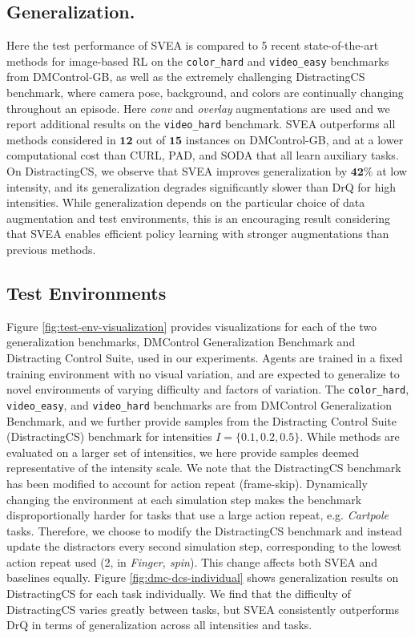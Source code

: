 \subsection{\textbf{Generalization.}}
Here the test performance of SVEA is compared to 5 recent state-of-the-art methods for image-based RL on the \texttt{color\_hard} and \texttt{video\_easy} benchmarks from DMControl-GB, as well as the extremely challenging DistractingCS benchmark, where camera pose, background, and colors are continually changing throughout an episode. Here \textit{conv} and \textit{overlay} augmentations are used and we report additional results on the \texttt{video\_hard} benchmark. SVEA outperforms all methods considered in $\mathbf{12}$ out of $\mathbf{15}$ instances on DMControl-GB, and at a lower computational cost than CURL, PAD, and SODA that all learn auxiliary tasks. On DistractingCS, we observe that SVEA improves generalization by $\mathbf{42\%}$ at low intensity, and its generalization degrades significantly slower than DrQ for high intensities. While generalization depends on the particular choice of data augmentation and test environments, this is an encouraging result considering that SVEA enables efficient policy learning with stronger augmentations than previous methods.


\subsection{\textbf{Test Environments}}
Figure \ref{fig:test-env-visualization} provides visualizations for each of the two generalization benchmarks, DMControl Generalization Benchmark and Distracting Control Suite, used in our experiments. Agents are trained in a fixed training environment with no visual variation, and are expected to generalize to novel environments of varying difficulty and factors of variation. The \texttt{color\_hard}, \texttt{video\_easy}, and \texttt{video\_hard} benchmarks are from DMControl Generalization Benchmark, and we further provide samples from the Distracting Control Suite (DistractingCS) benchmark for intensities $I=\{0.1, 0.2, 0.5\}$. 
While methods are evaluated on a larger set of intensities, we here provide samples deemed representative of the intensity scale. We note that the DistractingCS benchmark has been modified to account for action repeat (frame-skip). Dynamically changing the environment at each simulation step makes the benchmark disproportionally harder for tasks that use a large action repeat, e.g. \textit{Cartpole} tasks. Therefore, we choose to modify the DistractingCS benchmark and instead update the distractors every second simulation step, corresponding to the lowest action repeat used (2, in \textit{Finger, spin}). This change affects both SVEA and baselines equally. Figure \ref{fig:dmc-dcs-individual} shows generalization results on DistractingCS for each task individually. We find that the difficulty of DistractingCS varies greatly between tasks, but SVEA consistently outperforms DrQ in terms of generalization across all intensities and tasks.

